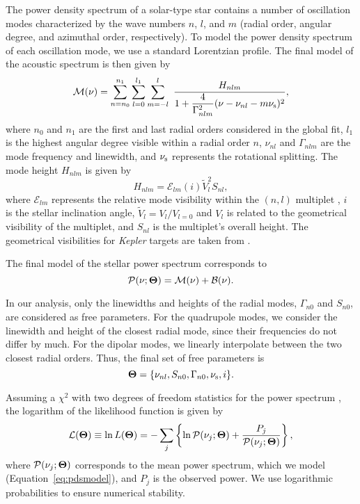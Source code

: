 \documentclass[twocolumn]{aastex61}%
\begin{document}
The power density spectrum of a solar-type star contains a number of oscillation modes characterized by the wave numbers $n$, $l$, and $m$ (radial order, angular degree, and azimuthal order, respectively). To model the power density spectrum of each oscillation mode, we use a standard Lorentzian profile. The final model of the acoustic spectrum is then given by
\begin{equation}
\mathcal{M}(\nu)=\sum_{n=n_0}^{n_1}\sum_{l=0}^{l_1}\sum_{m=-l}^l\,\,\dfrac{H_{nlm}}{1+\dfrac{4}{\Gamma_{nlm}^2}(\nu-\nu_{nl}-m\nu_{\rm s})^2},
\end{equation}
where $n_0$ and $n_1$ are the first and last radial orders considered in the global fit, $l_1$ is the highest angular degree visible within a radial order $n$, $\nu_{nl}$ and $\Gamma_{nlm}$ are the mode frequency and linewidth, and $\nu_{\rm s}$ represents the rotational splitting. The mode height $H_{nlm}$ is given by
\begin{equation}
H_{nlm}=\mathcal{E}_{lm}(i)\widetilde{V}_l^2S_{nl},
\end{equation}
where $\mathcal{E}_{lm}$ represents the relative mode visibility within the $(n,l)$ multiplet \citep{Gizon2003}, $i$  is the stellar inclination angle, $\widetilde{V}_l=V_l/V_{l=0}$ and $V_l$ is related to the geometrical visibility of the multiplet, and $S_{nl}$ is the multiplet's overall height. The geometrical visibilities for {\it Kepler} targets are taken from \citet{Handberg2011}.

The final model of the stellar power spectrum corresponds to
\begin{equation}
\mathcal{P}(\nu;{\bf\Theta})=\mathcal{M}(\nu)+\mathcal{B}(\nu).\label{eq:pdsmodel}
\end{equation}

In our analysis, only the linewidths and heights of the radial modes, $\Gamma_{n0}$ and $S_{n0}$, are considered as free parameters. For the quadrupole modes, we consider the linewidth and height of the closest radial mode, since their frequencies do not differ by much. For the dipolar modes, we linearly interpolate between the two closest radial orders. Thus, the final set of free parameters is
\begin{equation}
{\bf\Theta}=\{\nu_{nl},S_{n0},\Gamma_{n0},\nu_\text{s},i\}.
\end{equation}

Assuming a $\chi^2$ with two degrees of freedom statistics for the power spectrum \citep{Duvall1986,Anderson1990,Gabriel1994}, the logarithm of the likelihood function is given by\vspace{-0.1cm}
\begin{equation}
\mathcal{L}({\bf\Theta})\equiv\ln L({\bf\Theta})=-\sum_j\left\{\ln\mathcal{P}(\nu_j;{\bf\Theta})+\dfrac{P_j}{\mathcal{P}(\nu_j;{\bf\Theta})}\right\},
\end{equation}
where $\mathcal{P}(\nu_j;{\bf \Theta})$ corresponds to the mean power spectrum, which we model (Equation~\ref{eq:pdsmodel}), and $P_j$ is the observed power. We use logarithmic probabilities to ensure numerical stability.
\end{document}
